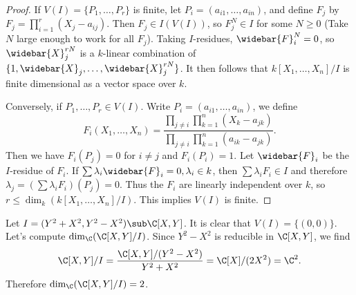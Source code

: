 \begin{proof}
If $V(I)=\{P_1,\dots,P_r\}$ is finite, let $P_i=(a_{i1},\dots,a_{in})$, and define $F_j$ by $F_j=\prod_{i=1}^{r}(X_j-a_{ij})$. Then $F_j\in I(V(I))$, so $F_j^N\in I$ for some $N\geq0$ (Take $N$ large enough to work for all $F_j$). Taking $I$-residues, $\widebar{F}^N_i=0$, so $\widebar{X}_j^{rN}$ is a $k$-linear combination of $\{1,\widebar{X}_j,\dots,\widebar{X}_j^{rN}\}$. It then follows that $k[X_1,\dots,X_n]/I$ is finite dimensional as a vector space over $k$.\par
Conversely, if $P_1,\dots,P_r\in V(I)$. Write $P_i=(a_{i1},\dots,a_{in})$, we define
\[F_i(X_1,\dots,X_n)=\frac{\prod_{j\neq i}\prod_{k=1}^{n}(X_k-a_{jk})}{\prod_{j\neq i}\prod_{k=1}^{n}(a_{ik}-a_{jk})}.\]
Then we have $F_i(P_j)=0$ for $i\neq j$ and $F_i(P_i)=1$. Let $\widebar{F}_i$ be the $I$-residue of $F_i$. If $\sum\lambda_i\widebar{F}_i=0,\lambda_i\in k$, then $\sum\lambda_i F_i\in I$ and therefore $\lambda_j=(\sum\lambda_iF_i)(P_j)=0$. Thus the $F_i$ are linearly independent over $k$, so $r\leq\dim_k(k[X_1,\dots,X_n]/I)$. This implies $V(I)$ is finite.\par
\end{proof}
\begin{example}
Let $I=(Y^2+X^2,Y^2-X^2)\sub\C[X,Y]$. It is clear that $V(I)=\{(0,0)\}$. Let's compute $\dim_\C(\C[X,Y]/I)$. Since $Y^2-X^2$ is reducible in $\C[X,Y]$, we find
\[\C[X,Y]/I=\frac{\C[X,Y]/(Y^2-X^2)}{Y^2+X^2}=\C[X]/(2X^2)=\C^2.\]
Therefore $\dim_\C(\C[X,Y]/I)=2$.
\end{example}
